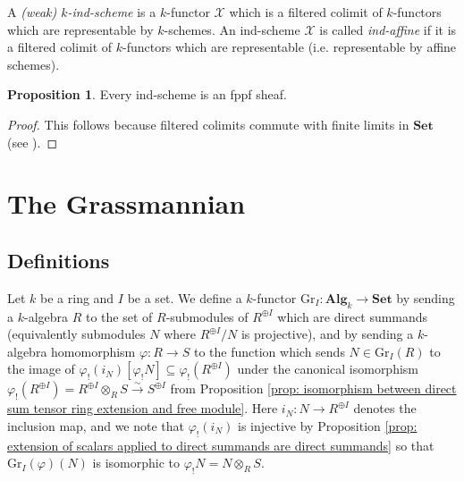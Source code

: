\documentclass[oneside,11pt]{amsart}
\newcommand{\bSet}{\ensuremath{\textbf{Set}}}
\newcommand{\bAlg}{\ensuremath{\textbf{Alg}}}
\newcommand{\mX}{\ensuremath{\mathcal{X}}}
\newcommand{\Gr}{\ensuremath{\text{Gr}}}
\theoremstyle{definition}
\newtheorem{proof techniques}{Proof Techniques}
\newtheorem{proposition}{Proposition}
\begin{document}
A \emph{(weak) $k$-ind-scheme} is a $k$-functor $\mX$ which is a filtered colimit of $k$-functors which are representable by $k$-schemes. An ind-scheme $\mX$ is called \emph{ind-affine} if it is a filtered colimit of $k$-functors which are representable (i.e. representable by affine schemes). 

\begin{proposition}\label{prop: ind-schemes are fppf sheaves}
Every ind-scheme is an fppf sheaf. 
\end{proposition}

\begin{proof}
This follows because filtered colimits commute with finite limits in $\bSet$ (see \cite[{002W}]{stacks-project}). 
\end{proof}



\section{The Grassmannian} \label{sec: the grassmannian}

\subsection{Definitions}


Let $k$ be a ring and $I$ be a set. We define a $k$-functor $\Gr_I: \bAlg_k \to \bSet$ by sending a $k$-algebra $R$ to the set of $R$-submodules of $R^{\oplus I}$ which are direct summands (equivalently submodules $N$ where $R^{\oplus I} / N$ is projective), and by sending a $k$-algebra homomorphism $\varphi: R \to S$ to the function which sends $N \in \Gr_I(R)$ to the image of $\varphi_! ( i_N ) [ \varphi_! N ] \subseteq \varphi_!(R^{\oplus I})$ under the canonical isomorphism $\varphi_!(R^{\oplus I}) = R^{\oplus I} \otimes_R S \overset{\sim}{\to} S^{\oplus I}$ from Proposition \ref{prop: isomorphism between direct sum tensor ring extension and free module}. Here $i_N : N \to R^{\oplus I}$ denotes the inclusion map, and we note that $\varphi_!(i_N)$ is injective by Proposition \ref{prop: extension of scalars applied to direct summands are direct summands} so that $\Gr_I(\varphi)(N)$ is isomorphic to $\varphi_! N = N \otimes_R S$. 
\end{document}
